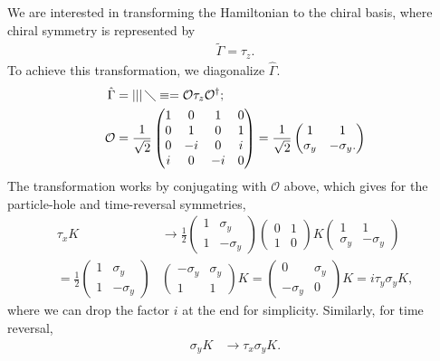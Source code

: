 \documentclass[aps,prb,twocolumn,showpacs,superscriptaddress,10p,longbibliography]{revtex4-1}
\begin{document}
We are interested in transforming the Hamiltonian to the chiral basis, where
chiral symmetry is represented by 
\begin{align}
  \tilde{\Gamma} = \tau_z.
\end{align}
To achieve this transformation, we diagonalize $\hat{\Gamma}$.
\begin{align}
  \hat{\Gamma} &= ||| \, \diagdown \equiv = \mathcal{O} \tau_z \mathcal{O}^\dagger;\\
  \mathcal{O} &= \frac{1}{\sqrt 2}
  \begin{pmatrix} 1 & 0 & 1 & 0\\
    0 & 1 & 0 & 1 \\
    0 & -i & 0 & i\\
    i & 0 & -i & 0
  \end{pmatrix} =
  \frac{1}{\sqrt 2}
  \begin{pmatrix}
    1 & 1 \\ \sigma_y & -\sigma_y.
    \end{pmatrix}
\end{align}
The transformation works by conjugating with $\mathcal{O}$ above,
which gives for the particle-hole and time-reversal symmetries,
\begin{align}
  \tau_x K &\to \frac{1}{2}
  \begin{pmatrix}
    1 & \sigma_y \\ 1 & -\sigma_y
  \end{pmatrix}
  \begin{pmatrix}  0 & 1 \\ 1 & 0 \end{pmatrix} K  
  \begin{pmatrix}
    1 & 1 \\ \sigma_y & -\sigma_y
  \end{pmatrix} \nonumber \\
  = \frac{1}{2}
  \begin{pmatrix}
    1 & \sigma_y \\ 1 & -\sigma_y
  \end{pmatrix}&
  \begin{pmatrix}
   -\sigma_y & \sigma_y \\ 1 & 1
  \end{pmatrix}
  K =
  \begin{pmatrix}
   0 & \sigma_y \\ -\sigma_y &0
  \end{pmatrix} K
  =
  i \tau_y \sigma_y K,
\end{align}
where we can drop the factor $i$ at the end for simplicity.
Similarly, for time reversal,  
\begin{align}
  \sigma_y K &\to \tau_x \sigma_y K.
\end{align}
\end{document}
